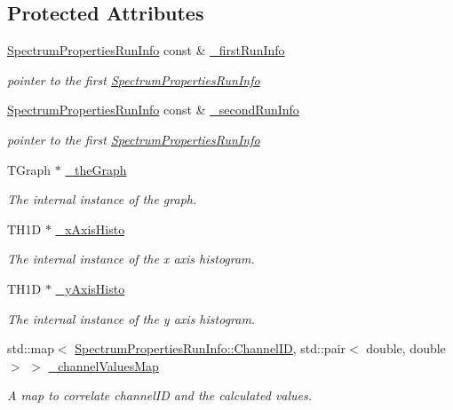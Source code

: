 \subsection*{Protected Attributes}
\begin{DoxyCompactItemize}
\item 
\hyperlink{class_spectrum_properties_run_info}{SpectrumPropertiesRunInfo} const \& \hyperlink{class_run_comparator_a3893b88661dc9ab2c46b8881d20772a2}{\_\-firstRunInfo}
\begin{DoxyCompactList}\small\item\em pointer to the first \hyperlink{class_spectrum_properties_run_info}{SpectrumPropertiesRunInfo} \item\end{DoxyCompactList}\item 
\hyperlink{class_spectrum_properties_run_info}{SpectrumPropertiesRunInfo} const \& \hyperlink{class_run_comparator_a2dc5760e0e8acc987f8a56a906895e5a}{\_\-secondRunInfo}
\begin{DoxyCompactList}\small\item\em pointer to the first \hyperlink{class_spectrum_properties_run_info}{SpectrumPropertiesRunInfo} \item\end{DoxyCompactList}\item 
TGraph $\ast$ \hyperlink{class_run_comparator_ade24b6bfa3960ac66f027a2669014d6a}{\_\-theGraph}
\begin{DoxyCompactList}\small\item\em The internal instance of the graph. \item\end{DoxyCompactList}\item 
TH1D $\ast$ \hyperlink{class_run_comparator_ab86d48424540d0f3f9abf52a2c11366b}{\_\-xAxisHisto}
\begin{DoxyCompactList}\small\item\em The internal instance of the x axis histogram. \item\end{DoxyCompactList}\item 
TH1D $\ast$ \hyperlink{class_run_comparator_a05efdd671ec49502c946eb813e84ed62}{\_\-yAxisHisto}
\begin{DoxyCompactList}\small\item\em The internal instance of the y axis histogram. \item\end{DoxyCompactList}\item 
std::map$<$ \hyperlink{class_spectrum_properties_run_info_1_1_channel_i_d}{SpectrumPropertiesRunInfo::ChannelID}, std::pair$<$ double, double $>$ $>$ \hyperlink{class_run_comparator_aae7b9f0694da7b251fdc513c5cf466b7}{\_\-channelValuesMap}
\begin{DoxyCompactList}\small\item\em A map to correlate channelID and the calculated values. \item\end{DoxyCompactList}\end{DoxyCompactItemize}


